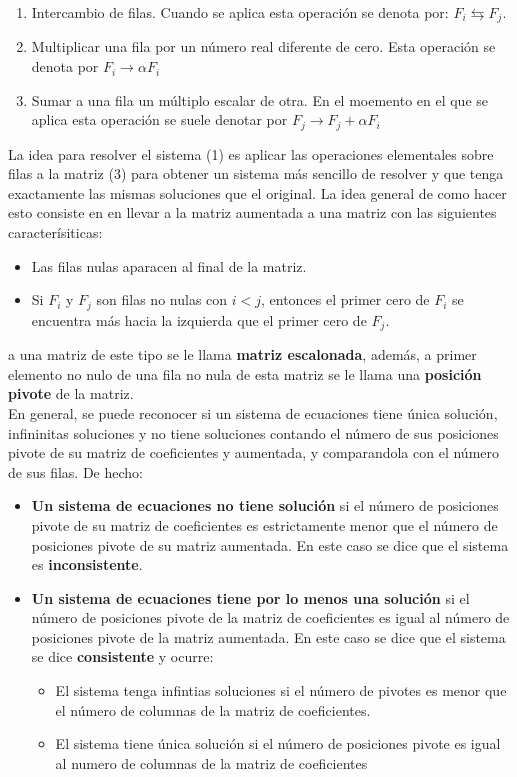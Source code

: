 \documentclass[12pt]{book}
\begin{document}
    \begin{enumerate}
        \item Intercambio de filas. Cuando se aplica esta operación se denota por: 
        $F_{i} \leftrightarrows F_{j}$.
        
        \item Multiplicar una fila por un número real diferente de cero. 
        Esta operación se denota por $F_{i}  \to \alpha F_{i}$
        \item Sumar a una fila un múltiplo escalar de otra. En el moemento en el que se aplica 
        esta operación se suele denotar por $F_{j} \to F_{j} + \alpha F_{i}$
    \end{enumerate}
    La idea para resolver el sistema (1) es aplicar las operaciones elementales sobre filas a la matriz 
    (3) para obtener un sistema más sencillo de resolver y que tenga exactamente las mismas soluciones que el original. La 
    idea general de como hacer esto consiste en en llevar a la matriz aumentada a una matriz
    con las siguientes caracterísiticas:
    \begin{itemize}
        \item Las filas nulas aparacen al final de la matriz.
        \item Si $F_{i}$ y $F_{j}$ son filas no nulas con $i < j$, entonces el primer cero de $F_{i}$ se
        encuentra más hacia la izquierda que el primer cero de $F_{j}$.
    \end{itemize}
    a una matriz de este tipo se le llama \textbf{matriz escalonada}, además, a primer elemento no nulo de una fila no nula de esta matriz se le llama una \textbf{posición pivote} de la matriz.
    \\ 
    En general, se puede reconocer si un sistema de ecuaciones tiene única solución, infininitas soluciones y no tiene soluciones contando el número de sus posiciones pivote de su matriz de coeficientes y aumentada, y comparandola con el número de sus filas. De hecho:
    \begin{itemize}
        \item \textbf{Un sistema de ecuaciones no tiene solución} si el número de posiciones pivote de su matriz de coeficientes es estrictamente menor que el número de posiciones pivote de su matriz aumentada. En este caso se dice que el sistema es \textbf{inconsistente}.
        \item \textbf{Un sistema de ecuaciones tiene por lo menos una solución} si el número de posiciones pivote de la matriz de coeficientes es igual al número de posiciones pivote de la matriz aumentada. En este caso se dice que el sistema se dice \textbf{consistente} y ocurre:
        \begin{itemize}
            \item El sistema tenga infintias soluciones si el número de pivotes es menor que el número de columnas de la matriz de coeficientes.
            \item El sistema tiene única solución si el número de posiciones pivote es igual al numero de columnas de la matriz de coeficientes
        \end{itemize}
    \end{itemize}
    
\end{document}
